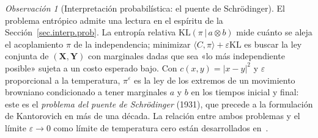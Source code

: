 \documentclass[12pt, a4paper]{amsbook}
\theoremstyle{remark}
\newtheorem{obs}[teo]{Observación}
\theoremstyle{definition}
\numberwithin{section}{chapter}
\numberwithin{subsection}{section}
\numberwithin{equation}{section}
\numberwithin{figure}{chapter}
\begin{document}
\begin{obs}[Interpretación probabilística: el puente de Schrödinger]
El problema entrópico admite una lectura en el espíritu de la
Sección~\ref{sec.interp.prob}. La entropía relativa
$\mathrm{KL}(\pi\,|\,a\otimes b)$ mide cuánto se aleja el acoplamiento $\pi$
de la independencia; minimizar $\langle C,\pi\rangle+\varepsilon\mathrm{KL}$
es buscar la ley conjunta de $(\mathbf X,\mathbf Y)$ con marginales dadas que
sea «lo más independiente posible» sujeta a un costo esperado bajo. Con
$c(x,y)=|x-y|^2$ y $\varepsilon$ proporcional a la temperatura, $\pi^\varepsilon$
es la ley de los extremos de un movimiento browniano condicionado a tener
marginales $a$ y $b$ en los tiempos inicial y final: este es el
\emph{problema del puente de Schrödinger} (1931), que precede a la
formulación de Kantorovich en más de una década. La relación entre ambos
problemas y el límite $\varepsilon\to0$ como límite de temperatura cero
están desarrollados en~\cite{Leonard2014}.
\end{obs}
\end{document}

